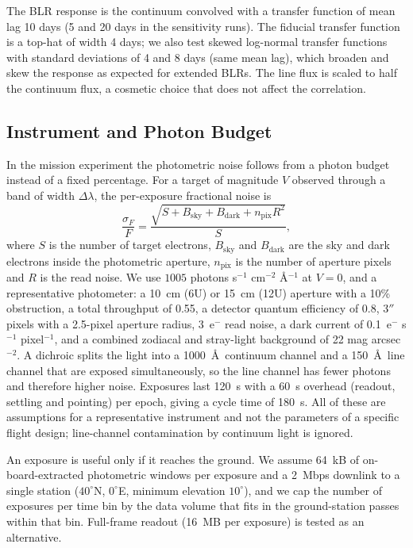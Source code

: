 \documentclass[11pt]{article}
\begin{document}
The BLR response is the continuum convolved with a transfer function of mean lag 10 days (5 and 20 days in the sensitivity runs). The fiducial transfer function is a top-hat of width 4 days; we also test skewed log-normal transfer functions with standard deviations of 4 and 8 days (same mean lag), which broaden and skew the response as expected for extended BLRs. The line flux is scaled to half the continuum flux, a cosmetic choice that does not affect the correlation.

\subsection{Instrument and Photon Budget}
\label{sec:instrument}

In the mission experiment the photometric noise follows from a photon budget instead of a fixed percentage. For a target of magnitude $V$ observed through a band of width $\Delta\lambda$, the per-exposure fractional noise is
\begin{equation}
\frac{\sigma_F}{F} = \frac{\sqrt{S + B_{\mathrm{sky}} + B_{\mathrm{dark}} + n_{\mathrm{pix}} R^2}}{S},
\end{equation}
where $S$ is the number of target electrons, $B_{\mathrm{sky}}$ and $B_{\mathrm{dark}}$ are the sky and dark electrons inside the photometric aperture, $n_{\mathrm{pix}}$ is the number of aperture pixels and $R$ is the read noise. We use $1005$ photons s$^{-1}$ cm$^{-2}$ \AA$^{-1}$ at $V=0$, and a representative photometer: a 10~cm (6U) or 15~cm (12U) aperture with a 10\% obstruction, a total throughput of 0.55, a detector quantum efficiency of 0.8, 3$''$ pixels with a 2.5-pixel aperture radius, 3~e$^-$ read noise, a dark current of 0.1~e$^-$ s$^{-1}$ pixel$^{-1}$, and a combined zodiacal and stray-light background of 22 mag arcsec$^{-2}$. A dichroic splits the light into a 1000~\AA\ continuum channel and a 150~\AA\ line channel that are exposed simultaneously, so the line channel has fewer photons and therefore higher noise. Exposures last 120~s with a 60~s overhead (readout, settling and pointing) per epoch, giving a cycle time of 180~s. All of these are assumptions for a representative instrument and not the parameters of a specific flight design; line-channel contamination by continuum light is ignored.

An exposure is useful only if it reaches the ground. We assume 64~kB of on-board-extracted photometric windows per exposure and a 2~Mbps downlink to a single station ($40^{\circ}$N, $0^{\circ}$E, minimum elevation $10^{\circ}$), and we cap the number of exposures per time bin by the data volume that fits in the ground-station passes within that bin. Full-frame readout (16~MB per exposure) is tested as an alternative.
\end{document}
